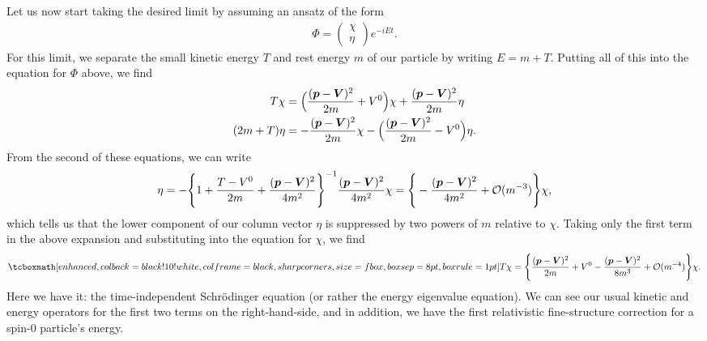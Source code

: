 Let us now start taking the desired limit by assuming an ansatz of the form
\begin{align}
    \Phi = 
    \begin{pmatrix}
        \chi \\ \eta
    \end{pmatrix}
    e^{-i E t}
.\end{align}
For this limit, we separate the small kinetic energy $T$ and rest energy $m$ of our particle by writing $E = m + T$.
Putting all of this into the equation for $\Phi$ above, we find
\begin{align}
    T \chi &= \Big( \frac{(\vb*{p} - \vb*{V})^2}{2m} + V^{0} \Big) \chi + \frac{(\vb*{p} - \vb*{V})^2}{2m} \eta \\
    (2 m + T) \eta &= -\frac{(\vb*{p} - \vb*{V})^2}{2m} \chi - \Big( \frac{(\vb*{p} - \vb*{V})^2}{2m} - V^{0} \Big) \eta
.\end{align}
From the second of these equations, we can write
\begin{align}
    \eta = - \Bigg\{ 1 + \frac{T - V^{0}}{2m} + \frac{(\vb*{p} - \vb*{V})^2}{4m^2}  \Bigg\}^{-1} \frac{(\vb*{p} - \vb*{V})^2}{4m^2} \chi = \Bigg\{ -\frac{(\vb*{p} - \vb*{V})^2}{4 m^2} + \mathcal{O}(m^{-3}) \Bigg\} \chi
,\end{align}
which tells us that the lower component of our column vector $\eta$ is suppressed by two powers of $m$ relative to $\chi$.
Taking only the first term in the above expansion and substituting into the equation for $\chi$, we find
\begin{align}
    \eqbox{T \chi = \Bigg\{ \frac{(\vb*{p} - \vb*{V})^2}{2m} + V^{0} - \frac{(\vb*{p} - \vb*{V})^2}{8m^3} + \mathcal{O}(m^{-4}) \Bigg\} \chi }
.\end{align}
Here we have it: the time-independent Schr\"{o}dinger equation (or rather the energy eigenvalue equation).
We can see our usual kinetic and energy operators for the first two terms on the right-hand-side, and in addition, we have the first relativistic fine-structure correction for a spin-0 particle's energy.

